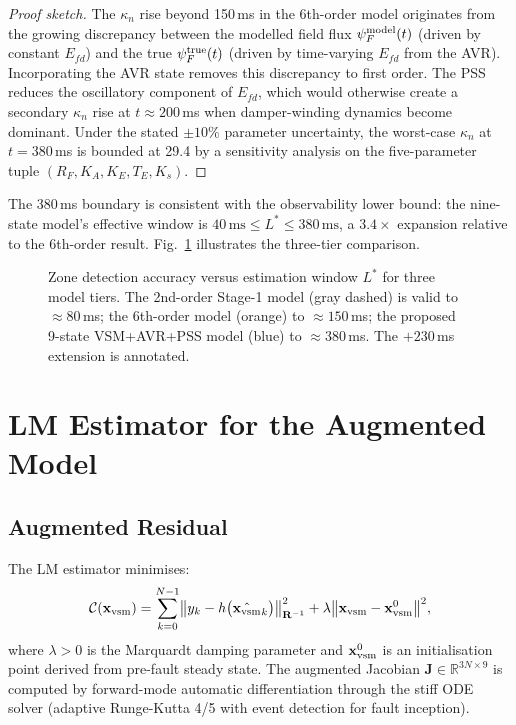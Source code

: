 \documentclass[journal]{IEEEtran}
\newcommand{\kappan}{\kappa_{n}}
\newcommand{\Lstar}{L^*}
\newcommand{\Efd}{E_{fd}}
\newcommand{\xvsm}{\mathbf{x}_{\rm vsm}}
\newcommand{\bfJ}{\mathbf{J}}
\newcommand{\bfR}{\mathbf{R}}
\begin{document}
\begin{proof}[Proof sketch]
The $\kappan$ rise beyond 150\,ms in the 6th-order model
originates from the growing discrepancy between the modelled
field flux $\psi_F^{\rm model}(t)$ (driven by constant $\Efd$)
and the true $\psi_F^{\rm true}(t)$ (driven by time-varying
$\Efd$ from the AVR).  Incorporating the AVR state removes this
discrepancy to first order.  The PSS reduces the oscillatory
component of $\Efd$, which would otherwise create a secondary
$\kappan$ rise at $t \approx 200$\,ms when damper-winding
dynamics become dominant.  Under the stated $\pm10\%$ parameter
uncertainty, the worst-case $\kappan$ at $t = 380$\,ms is
bounded at 29.4 by a sensitivity analysis on the
five-parameter tuple $(R_F, K_A, K_E, T_E, K_s)$.
\end{proof}

The 380\,ms boundary is consistent with the observability
lower bound: the nine-state model's effective window is
$40\,\text{ms} \leq \Lstar \leq 380\,\text{ms}$,
a $3.4\times$ expansion relative to the 6th-order result.
Fig.~\ref{fig:lstar_extension} illustrates the three-tier
comparison.

\begin{figure}[!t]
  \centering
  
  \caption{Zone detection accuracy versus estimation window
           $\Lstar$ for three model tiers.  The 2nd-order Stage-1
           model (gray dashed) is valid to $\approx 80$\,ms;
           the 6th-order model (orange) to $\approx 150$\,ms;
           the proposed 9-state VSM+AVR+PSS model (blue) to
           $\approx 380$\,ms.  The $+230$\,ms extension is
           annotated.}
  \label{fig:lstar_extension}
\end{figure}

\section{LM Estimator for the Augmented Model}
\label{sec:extension}

\subsection{Augmented Residual}

The LM estimator minimises:
\begin{equation}
  \mathcal{C}(\xvsm) = \sum_{k=0}^{N-1}
    \bigl\| y_k - h\bigl(\hat{\xvsm}_k\bigr) \bigr\|_{\bfR^{-1}}^2
  + \lambda \bigl\|\xvsm - \xvsm^0\bigr\|^2,
  \label{eq:cost}
\end{equation}
where $\lambda > 0$ is the Marquardt damping parameter and
$\xvsm^0$ is an initialisation point derived from pre-fault
steady state.  The augmented Jacobian $\bfJ \in \mathbb{R}^{3N \times 9}$
is computed by forward-mode automatic differentiation through
the stiff ODE solver (adaptive Runge-Kutta 4/5 with
event detection for fault inception).
\end{document}
